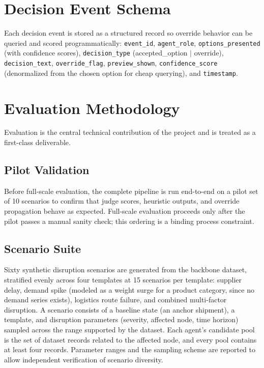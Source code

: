 \documentclass[conference]{IEEEtran}
\begin{document}
\section{Decision Event Schema}
\label{sec:schema}
Each decision event is stored as a structured record so override behavior can be queried and scored programmatically: \texttt{event\_id}, \texttt{agent\_role}, \texttt{options\_presented} (with confidence scores), \texttt{decision\_type} (accepted\_option $\vert$ override), \texttt{decision\_text}, \texttt{override\_flag}, \texttt{preview\_shown}, \texttt{confidence\_score} (denormalized from the chosen option for cheap querying), and \texttt{timestamp}.

\section{Evaluation Methodology}
\label{sec:eval}
Evaluation is the central technical contribution of the project and is treated as a first-class deliverable.

\subsection{Pilot Validation}
Before full-scale evaluation, the complete pipeline is run end-to-end on a pilot set of 10 scenarios to confirm that judge scores, heuristic outputs, and override propagation behave as expected. Full-scale evaluation proceeds only after the pilot passes a manual sanity check; this ordering is a binding process constraint.

\subsection{Scenario Suite}
Sixty synthetic disruption scenarios are generated from the backbone dataset, stratified evenly across four templates at 15 scenarios per template: supplier delay, demand spike (modeled as a weight surge for a product category, since no demand series exists), logistics route failure, and combined multi-factor disruption. A scenario consists of a baseline state (an anchor shipment), a template, and disruption parameters (severity, affected node, time horizon) sampled across the range supported by the dataset. Each agent's candidate pool is the set of dataset records related to the affected node, and every pool contains at least four records. Parameter ranges and the sampling scheme are reported to allow independent verification of scenario diversity.
\end{document}
